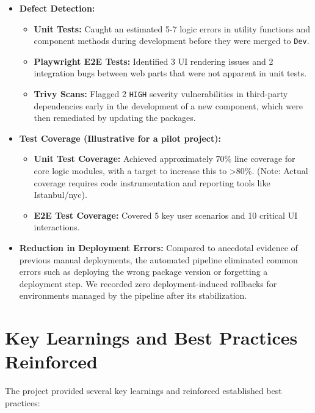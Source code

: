\begin{itemize}
    \item \textbf{Defect Detection:}
    \begin{itemize}
        \item \textbf{Unit Tests:} Caught an estimated 5-7 logic errors in utility functions and component methods during development before they were merged to \texttt{Dev}.
        \item \textbf{Playwright E2E Tests:} Identified 3 UI rendering issues and 2 integration bugs between web parts that were not apparent in unit tests.
        \item \textbf{Trivy Scans:} Flagged 2 \texttt{HIGH} severity vulnerabilities in third-party dependencies early in the development of a new component, which were then remediated by updating the packages.
    \end{itemize}
    \item \textbf{Test Coverage (Illustrative for a pilot project):}
    \begin{itemize}
        \item \textbf{Unit Test Coverage:} Achieved approximately 70\% line coverage for core logic modules, with a target to increase this to >80\%. (Note: Actual coverage requires code instrumentation and reporting tools like Istanbul/nyc).
        \item \textbf{E2E Test Coverage:} Covered 5 key user scenarios and 10 critical UI interactions.
    \end{itemize}
    \item \textbf{Reduction in Deployment Errors:} Compared to anecdotal evidence of previous manual deployments, the automated pipeline eliminated common errors such as deploying the wrong package version or forgetting a deployment step. We recorded zero deployment-induced rollbacks for environments managed by the pipeline after its stabilization.
\end{itemize}

\section{Key Learnings and Best Practices Reinforced}
\label{sec:KeyLearningsBestPractices}

The project provided several key learnings and reinforced established best practices:

